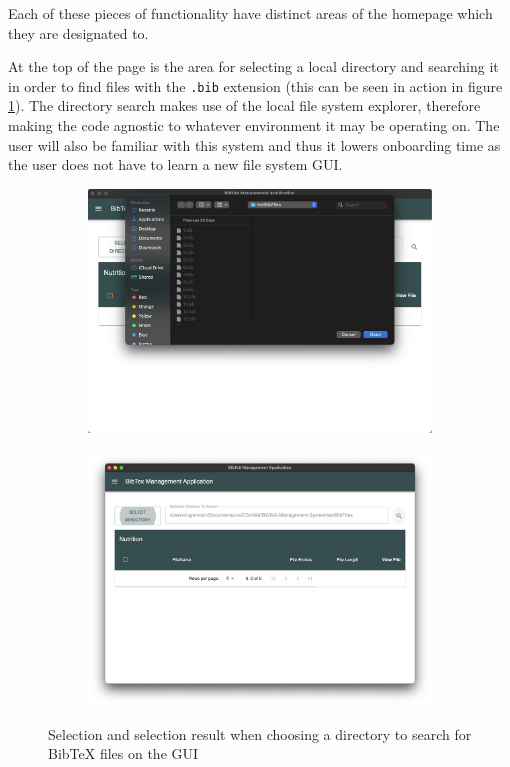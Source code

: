 \documentclass[a4paper,11pt]{article}
\newcommand{\code}[1]{\colorbox{codegray}{\texttt{#1}}}
\begin{document}
Each of these pieces of functionality have distinct areas of the homepage which they are designated to.

At the top of the page is the area for selecting a local directory and searching it in order to find files with the \code{.bib} extension (this can be seen in action in figure \ref{fig:fileSelectionToSearch}). The directory search makes use of the local file system explorer, therefore making the code agnostic to whatever environment it may be operating on. The user will also be familiar with this system and thus it lowers onboarding time as the user does not have to learn a new file system GUI.

\begin{figure}
    \centering
    \begin{subfigure}{0.49\textwidth}
       \includegraphics[width=\textwidth]{images/selectingFileSearch.png}
    \end{subfigure}
    \begin{subfigure}{0.49\textwidth}
       \includegraphics[width=\textwidth]{images/fileSelectedToSearch.png}
    \end{subfigure}
    \caption{Selection and selection result when choosing a directory to search for BibTeX files on the GUI}
    \label{fig:fileSelectionToSearch}
\end{figure}
\end{document}
